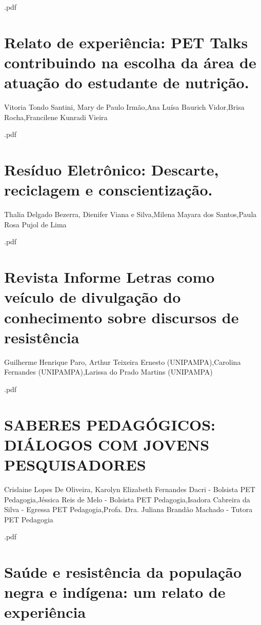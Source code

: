 

.pdf\section{Relato de experiência: PET Talks contribuindo na escolha da área de atuação do estudante de nutrição.}

Vitoria Tondo Santini, Mary de Paulo Irmão,Ana Luísa Baurich Vidor,Brisa Rocha,Francilene Kunradi Vieira



.pdf\section{Resíduo Eletrônico: Descarte, reciclagem e conscientização.}

Thalia Delgado Bezerra, Dienifer Viana e Silva,Milena Mayara dos Santos,Paula Rosa Pujol de Lima



.pdf\section{Revista Informe Letras como veículo de divulgação do conhecimento sobre discursos de resistência}

Guilherme Henrique Paro, Arthur Teixeira Ernesto (UNIPAMPA),Carolina Fernandes (UNIPAMPA),Larissa do Prado Martins (UNIPAMPA)



.pdf\section{SABERES PEDAGÓGICOS: DIÁLOGOS COM JOVENS PESQUISADORES}

Crislaine Lopes De Oliveira, Karolyn Elizabeth Fernandes Dacri - Bolsista PET Pedagogia,Jéssica Reis de Melo - Bolsista PET Pedagogia,Isadora Cabreira da Silva - Egressa PET Pedagogia,Profa. Dra. Juliana Brandão Machado - Tutora PET Pedagogia



.pdf\section{Saúde e resistência da população negra e indígena: um relato de experiência}

